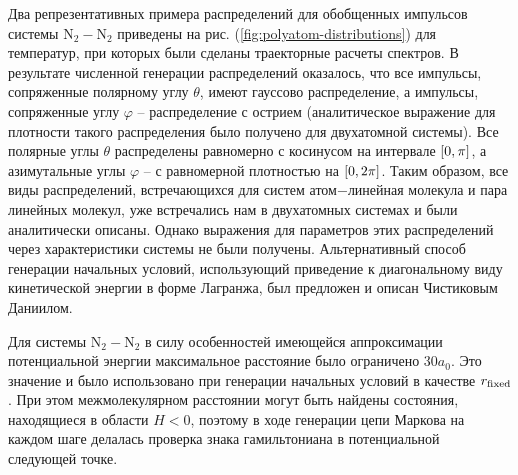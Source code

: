 Два репрезентативных примера распределений для обобщенных импульсов системы N$_2-$N$_2$  приведены на рис. (\ref{fig:polyatom-distributions}) для температур, при которых были сделаны траекторные расчеты спектров. В результате численной генерации распределений оказалось, что все импульсы, сопряженные полярному углу $\theta$, имеют гауссово распределение, а импульсы, сопряженные углу $\varphi$ -- распределение с острием (аналитическое выражение для плотности такого распределения было получено для двухатомной системы). Все полярные углы $\theta$ распределены равномерно с косинусом на интервале $\left[ 0, \pi \right]$, а азимутальные углы $\varphi$ -- с равномерной плотностью на $\left[ 0, 2\pi \right]$. Таким образом, все виды распределений, встречающихся для систем атом$-$линейная молекула и пара линейных молекул, уже встречались нам в двухатомных системах и были аналитически описаны. Однако выражения для параметров этих распределений через характеристики системы не были получены. Альтернативный способ генерации начальных условий, использующий приведение к диагональному виду кинетической энергии в форме Лагранжа, был предложен и описан Чистиковым Даниилом. \par
Для системы N$_2-$N$_2$ в силу особенностей имеющейся аппроксимации потенциальной энергии максимальное расстояние было ограничено $30 a_0$. Это значение и было использовано при генерации начальных условий в качестве $r_\text{fixed}$. При этом межмолекулярном расстоянии могут быть найдены состояния, находящиеся в области $H < 0$, поэтому в ходе генерации цепи Маркова на каждом шаге делалась проверка знака гамильтониана в потенциальной следующей точке. 
\setcounter{figure}{7}
